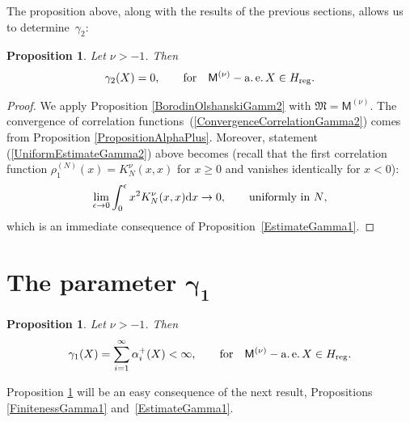 \documentclass[pdftex]{sigma}
\numberwithin{equation}{section}
\newtheorem{Proposition}[Theorem]{Proposition}
{ \theoremstyle{definition}
\newtheorem{Definition}[Theorem]{Definition}
\newtheorem{Remark}[Theorem]{Remark} }
\begin{document}
The proposition above, along with the results of the previous sections, allows us to determine~$\gamma_2$:

\begin{Proposition}\label{PropositionGamma2}
Let $\nu>-1$. Then
\begin{gather*}
\gamma_2(X)=0, \qquad \text{for} \quad \mathsf{M}^{(\nu)}-\operatorname{a.e.} X \in H_{{\rm reg}}.
\end{gather*}
\end{Proposition}

\begin{proof} We apply Proposition \ref{BorodinOlshanskiGamm2} with $\mathfrak{M}=\mathsf{M}^{(\nu)}$. The convergence of correlation functions~(\ref{ConvergenceCorrelationGamma2}) comes from Proposition \ref{PropositionAlphaPlus}. Moreover,
statement (\ref{UniformEstimateGamma2}) above becomes (recall that the first correlation function $\rho_1^{(N)}(x)=K_N^{\nu}(x,x)$ for $x\ge 0$ and vanishes identically for $x<0$):
\begin{gather*}
\lim_{\epsilon \to 0} \int_{0}^{\epsilon}x^2 K_N^{\nu}(x,x){\rm d}x \to 0, \qquad \text{uniformly in $N$},
\end{gather*}
which is an immediate consequence of Proposition~\ref{EstimateGamma1}.
\end{proof}

\section[The parameter $\gamma_1$]{The parameter $\boldsymbol{\gamma_1}$}\label{section7}

\begin{Proposition}\label{PropositionGamma1}
Let $\nu>-1$. Then
\begin{gather*}
\gamma_1(X)=\sum_{i=1}^{\infty}\alpha_i^+(X)<\infty, \qquad \text{for} \quad \mathsf{M}^{(\nu)}-\operatorname{a.e.} X \in H_{{\rm reg}}.
\end{gather*}
\end{Proposition}

Proposition \ref{PropositionGamma1} will be an easy consequence of the next result, Propositions \ref{FinitenessGamma1} and~\ref{EstimateGamma1}.
\end{document}

